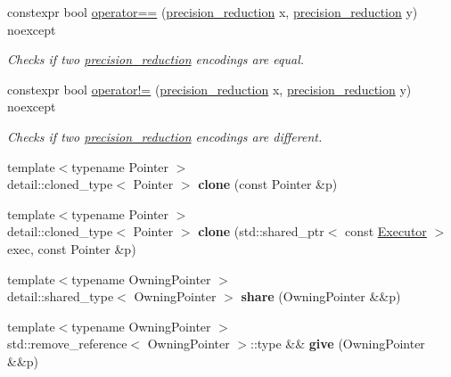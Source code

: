 \begin{DoxyCompactItemize}
\item 
constexpr bool \hyperlink{namespacegko_a4dbafa6e062c2036991ec8c3f6b201cf}{operator==} (\hyperlink{classgko_1_1precision__reduction}{precision\+\_\+reduction} x, \hyperlink{classgko_1_1precision__reduction}{precision\+\_\+reduction} y) noexcept
\begin{DoxyCompactList}\small\item\em Checks if two \hyperlink{classgko_1_1precision__reduction}{precision\+\_\+reduction} encodings are equal. \end{DoxyCompactList}\item 
constexpr bool \hyperlink{namespacegko_a61d408b4cd77aae6cac7a40c8307fddb}{operator!=} (\hyperlink{classgko_1_1precision__reduction}{precision\+\_\+reduction} x, \hyperlink{classgko_1_1precision__reduction}{precision\+\_\+reduction} y) noexcept
\begin{DoxyCompactList}\small\item\em Checks if two \hyperlink{classgko_1_1precision__reduction}{precision\+\_\+reduction} encodings are different. \end{DoxyCompactList}\item 
\mbox{\label{namespacegko_a1beb80750459e4201aa9d882d2d074c3}} 
{\footnotesize template$<$typename Pointer $>$ }\\detail\+::cloned\+\_\+type$<$ Pointer $>$ {\bfseries clone} (const Pointer \&p)
\item 
\mbox{\label{namespacegko_a13b00a9dd24aa08d4495762d89f3762a}} 
{\footnotesize template$<$typename Pointer $>$ }\\detail\+::cloned\+\_\+type$<$ Pointer $>$ {\bfseries clone} (std\+::shared\+\_\+ptr$<$ const \hyperlink{classgko_1_1Executor}{Executor} $>$ exec, const Pointer \&p)
\item 
\mbox{\label{namespacegko_a3ce296f73db0ff398bdea6009a3a5c58}} 
{\footnotesize template$<$typename Owning\+Pointer $>$ }\\detail\+::shared\+\_\+type$<$ Owning\+Pointer $>$ {\bfseries share} (Owning\+Pointer \&\&p)
\item 
\mbox{\label{namespacegko_acbd3fd6d07e498892881e8e2ab0b4167}} 
{\footnotesize template$<$typename Owning\+Pointer $>$ }\\std\+::remove\+\_\+reference$<$ Owning\+Pointer $>$\+::type \&\& {\bfseries give} (Owning\+Pointer \&\&p)

\end{DoxyCompactItemize}
